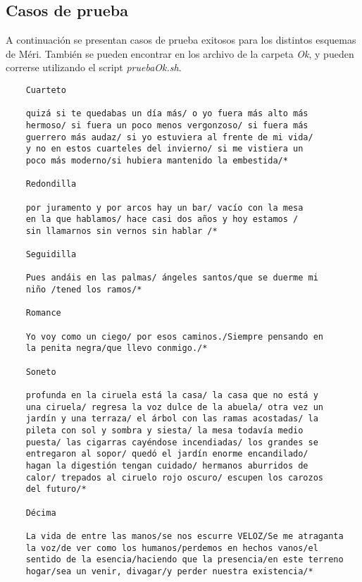 \documentclass[12pt, a4paper]{article}
\begin{document}
\subsection*{Casos de prueba}
A continuación se presentan casos de prueba exitosos para los distintos esquemas de Méri. También se pueden encontrar en los archivo de la carpeta \textit{Ok}, y pueden correrse utilizando el script \textit{pruebaOk.sh}.
\begin{verbatim}
    Cuarteto
    
    quizá si te quedabas un día más/ o yo fuera más alto más 
    hermoso/ si fuera un poco menos vergonzoso/ si fuera más 
    guerrero más audaz/ si yo estuviera al frente de mi vida/ 
    y no en estos cuarteles del invierno/ si me vistiera un 
    poco más moderno/si hubiera mantenido la embestida/*

    Redondilla

    por juramento y por arcos hay un bar/ vacío con la mesa 
    en la que hablamos/ hace casi dos años y hoy estamos / 
    sin llamarnos sin vernos sin hablar /*    

    Seguidilla
    
    Pues andáis en las palmas/ ángeles santos/que se duerme mi
    niño /tened los ramos/*
    
    Romance
    
    Yo voy como un ciego/ por esos caminos./Siempre pensando en 
    la penita negra/que llevo conmigo./*

    Soneto
    
    profunda en la ciruela está la casa/ la casa que no está y 
    una ciruela/ regresa la voz dulce de la abuela/ otra vez un 
    jardín y una terraza/ el árbol con las ramas acostadas/ la 
    pileta con sol y sombra y siesta/ la mesa todavía medio 
    puesta/ las cigarras cayéndose incendiadas/ los grandes se 
    entregaron al sopor/ quedó el jardín enorme encandilado/ 
    hagan la digestión tengan cuidado/ hermanos aburridos de 
    calor/ trepados al ciruelo rojo oscuro/ escupen los carozos 
    del futuro/*

    Décima
    
    La vida de entre las manos/se nos escurre VELOZ/Se me atraganta
    la voz/de ver como los humanos/perdemos en hechos vanos/el 
    sentido de la esencia/haciendo que la presencia/en este terreno
    hogar/sea un venir, divagar/y perder nuestra existencia/*
           
\end{verbatim}
\end{document}
